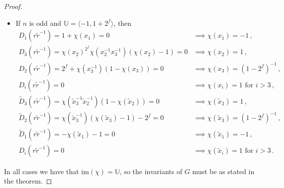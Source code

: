 \documentclass[a4paper]{amsart}
\theoremstyle{definition}
\begin{document}
\begin{proof}
\begin{itemize}
\begin{align*}
        \widetilde{D}_2(r\widetilde{r}^{-1}) = \chi(\widetilde{x}_2^{-1}\widetilde{x}_1^{-1})(1-\chi(\widetilde{x}_1)) = 0 &\implies \chi(\widetilde{x}_1) = 1\,,\\
        \widetilde{D}_1(r\widetilde{r}^{-1}) = \chi(\widetilde{x}_2^{-1})(\chi(\widetilde{x}_2) - 1) - 2 = 0 & \implies \chi(\widetilde{x}_2) = -1\,,\\
        \widetilde{D}_i(r\widetilde{r}^{-1}) = 0 &\implies \chi(\widetilde{x}_i) = 1\text{ for }i > 4.
    \end{align*}
    \item If \(n\) is odd and \(\mathbb{U} = \langle -1, 1+2^f\rangle\), then
    \begin{align*}
        D_1(r\widetilde{r}^{-1}) = 1 + \chi(x_1) = 0 & \implies \chi(x_1) = -1\,,\\
        D_3(r\widetilde{r}^{-1}) = \chi(x_2)^{2^f}\chi(x_2^{-1}x_3^{-1})(\chi(x_2)-1) = 0&\implies \chi(x_2) = 1\,,\\
        D_2(r\widetilde{r}^{-1}) = 2^f + \chi(x_3^{-1})(1-\chi(x_3)) =0&\implies \chi(x_3) = (1-2^f)^{-1}\,,\\
        D_i(r\widetilde{r}^{-1}) = 0 &\implies \chi(x_i) = 1\text{ for }i>3\,,\\
        \widetilde{D}_3(r\widetilde{r}^{-1}) = \chi(\widetilde{x}_3^{-1}\widetilde{x}_2^{-1})(1-\chi(\widetilde{x}_2)) =0 &\implies \chi(\widetilde{x}_2) = 1\,,\\
        \widetilde{D}_2(r\widetilde{r}^{-1}) =\chi(\widetilde{x}_3^{-1})(\chi(\widetilde{x}_3)-1) -2^f = 0 &\implies \chi(\widetilde{x}_3) = (1-2^f)^{-1}\,,\\
        \widetilde{D}_1(r\widetilde{r}^{-1}) = -\chi(\widetilde{x}_1)-1 = 0&\implies \chi(\widetilde{x}_1) = -1\,,\\
        D_i(r\widetilde{r}^{-1}) = 0 &\implies \chi(\widetilde{x}_i) = 1\text{ for }i>3\,.
    \end{align*}
\end{itemize}
In all cases we have that \(\mathrm{im}(\chi) = \mathbb{U}\), so the invariants of \(G\) must be as stated in the theorem.
\end{proof}
\end{document}
